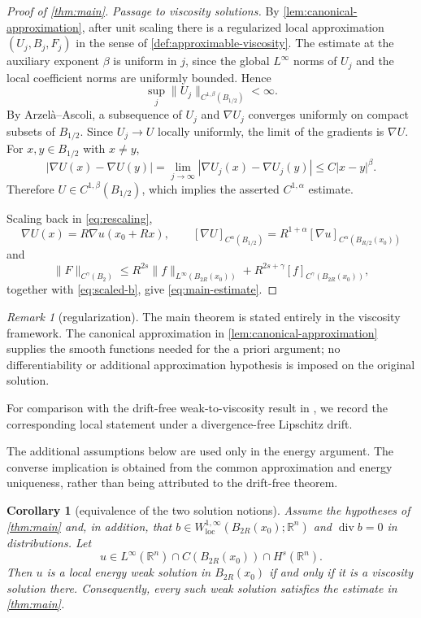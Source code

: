 \documentclass[reqno]{amsart}
\numberwithin{equation}{section}
\theoremstyle{plain}
\newtheorem{corollary}[theorem]{Corollary}
\theoremstyle{definition}
\theoremstyle{remark}
\newtheorem{remark}[theorem]{Remark}
\newcommand{\R}{\mathbb R}
\DeclareMathOperator{\divergence}{div}
\newcommand{\rev}[1]{#1}
\begin{document}
\begin{proof}[Proof of \cref{thm:main}]
\smallskip
\noindent\emph{Passage to viscosity solutions.}
\rev{By \cref{lem:canonical-approximation}, after unit scaling there is a
regularized local approximation $(U_j,B_j,F_j)$ in the sense of
\cref{def:approximable-viscosity}.  The estimate at the auxiliary exponent
$\beta$ is uniform in $j$, since the global $L^\infty$ norms of $U_j$ and
the local coefficient norms are uniformly bounded.  Hence
\[
 \sup_j\|U_j\|_{C^{1,\beta}(B_{1/2})}<\infty.
\]
By Arzel\`a--Ascoli, a subsequence of $U_j$ and $\nabla U_j$ converges
uniformly on compact subsets of $B_{1/2}$.  Since $U_j\to U$ locally
uniformly, the limit of the gradients is $\nabla U$.  For
$x,y\in B_{1/2}$ with $x\ne y$,
\[
 |\nabla U(x)-\nabla U(y)|
 =\lim_{j\to\infty}|\nabla U_j(x)-\nabla U_j(y)|
 \le C|x-y|^\beta.
\]
Therefore $U\in C^{1,\beta}(B_{1/2})$, which implies the asserted
$C^{1,\alpha}$ estimate.}

\rev{Scaling back in \eqref{eq:rescaling},
\[
 \nabla U(x)=R\nabla u(x_0+Rx),\qquad
 [\nabla U]_{C^\alpha(B_{1/2})}
 =R^{1+\alpha}[\nabla u]_{C^\alpha(B_{R/2}(x_0))}
\]
and
\[
 \|F\|_{C^\gamma(B_2)}
 \le R^{2s}\|f\|_{L^\infty(B_{2R}(x_0))}
 +R^{2s+\gamma}[f]_{C^\gamma(B_{2R}(x_0))},
\]
together with \eqref{eq:scaled-b}, give \eqref{eq:main-estimate}.}
\end{proof}

\begin{remark}[regularization]
The main theorem is stated entirely in the viscosity framework.  The
canonical approximation in \cref{lem:canonical-approximation} supplies the
smooth functions needed for the a priori argument; no differentiability or
additional approximation hypothesis is imposed on the original solution.
\end{remark}

For comparison with the drift-free weak-to-viscosity result in
\cite[Theorem~1]{ServadeiValdinoci2014}, we record the corresponding local statement
under a divergence-free Lipschitz drift.

\rev{The additional assumptions below are used only in the energy
argument.  The converse implication is obtained from the common
approximation and energy uniqueness, rather than being attributed to the
drift-free theorem.}

\begin{corollary}[equivalence of the two solution notions]
\label{cor:weak-viscosity-equivalence}
Assume the hypotheses of \cref{thm:main} and, in addition, that
$b\in W^{1,\infty}_{\mathrm{loc}}(B_{2R}(x_0);\R^n)$ and
$\divergence b=0$ in distributions.  Let
\[
 u\in L^\infty(\R^n)\cap C(B_{2R}(x_0))
       \cap \rev{H^s(\R^n)}.
\]
Then $u$ is a local energy weak solution in $B_{2R}(x_0)$ if and only if
it is a viscosity solution there.  Consequently, every such weak solution
satisfies the estimate in \cref{thm:main}.
\end{corollary}
\end{document}
